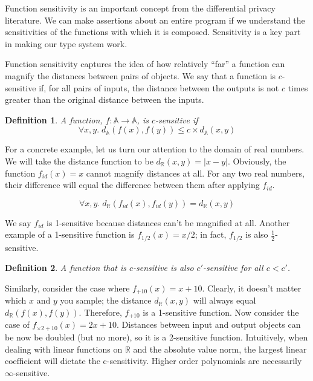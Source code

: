 \documentclass[12pt]{article}
\newtheorem{defn}{Definition}[section]
\begin{document}
Function sensitivity is an important concept from the differential privacy literature.
We can make assertions about an entire program if we understand the sensitivities of the functions with which it is composed.
Sensitivity is a key part in making our type system work.

Function sensitivity captures the idea of how relatively ``far'' a function can magnify the distances between pairs of objects.
We say that a function is $c$-sensitive if, for all pairs of inputs, the distance between the outputs is not $c$ times greater than the original distance between the inputs.

\begin{defn}\label{def:csens}
  A function, $f : \mathbb A \rightarrow \mathbb A$, is $c$-sensitive if
  $$\forall x,y.\; d_{\mathbb A}(f(x),f(y)) \le c \times d_{\mathbb A}(x,y)$$
\end{defn}

For a concrete example, let us turn our attention to the domain of real numbers.
We will take the distance function to be $d_\mathbb{R}(x,y) = |x - y|$.
Obviously, the function $f_{id}(x)=x$ cannot magnify distances at all.
For any two real numbers, their difference will equal the difference between them after applying $f_{id}$.

\[
  \forall x,y.\; d_\mathbb{R}(f_{id}(x),f_{id}(y)) = d_\mathbb{R}(x,y)
\]

We say $f_{id}$ is 1-sensitive because distances can't be magnified at all.
Another example of a 1-sensitive function is $f_{1/2}(x) = x/2$; in fact, $f_{1/2}$ is also $\frac{1}{2}$-sensitive.

\begin{defn}\label{def:clessthancprime}
  A function that is $c$-sensitive is also $c'$-sensitive for all $c < c'$.
\end{defn}

Similarly, consider the case where $f_{+10}(x) = x + 10$.
Clearly, it doesn't matter which $x$ and $y$ you sample; the distance $d_{\mathbb R}(x,y)$ will always equal $d_{\mathbb R}(f(x),f(y))$.
Therefore, $f_{+10}$ is a 1-sensitive function.
Now consider the case of $f_{\times 2+10}(x) = 2x + 10$.
Distances between input and output objects can be now be doubled (but no more), so it is a 2-sensitive function.
Intuitively, when dealing with linear functions on $\mathbb R$ and the absolute value norm, the largest linear coefficient will dictate the c-sensitivity.
Higher order polynomials are necessarily $\infty$-sensitive.
\end{document}
